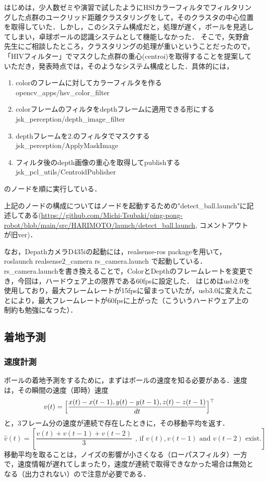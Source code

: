 \documentclass[10pt, oneside, titlepage]{ltjarticle}  %
\begin{document}
はじめは，少人数ゼミや演習で試したようにHSIカラーフィルタでフィルタリングした点群のユークリッド距離クラスタリングをして，そのクラスタの中心位置を取得していた\cite{detect2}．しかし，このシステム構成だと，処理が遅く，ボールを見逃してしまい，卓球ボールの認識システムとして機能しなかった．
そこで，矢野倉先生にご相談したところ，クラスタリングの処理が重いということだったので，「HIVフィルター」でマスクした点群の重心(centroi)を取得することを提案していただき\cite{detect1}，発表時点では，そのようなシステム構成とした．具体的には，
\begin{enumerate}
\item colorのフレームに対してカラーフィルタを作る \\
opencv\_apps/hsv\_color\_filter
\item colorフレームのフィルタをdepthフレームに適用できる形にする \\
jsk\_perception/depth\_image\_filter
\item depthフレームを2.のフィルタでマスクする \\
jsk\_perception/ApplyMaskImage
\item フィルタ後のdepth画像の重心を取得してpublishする \\
jsk\_pcl\_utils/CentroidPublisher
\end{enumerate}
のノードを順に実行している．

上記のノードの構成についてはノードを起動するための"detect\_ball.launch"に記述してある(\url{https://github.com/Michi-Tsubaki/ping-pong-robot/blob/main/src/HARIMOTO/launch/detect_ball.launch}, コメントアウトが旧ver)．

なお，DepathカメラD435iの起動には，realsense-ros packageを用いて，roslaunch realsense2\_camera rs\_camera.launch で起動している．rs\_camera.launchを書き換えることで，ColorとDepthのフレームレートを変更でき，今回は，ハードウェア上の限界である60fpsに設定した．\cite{detect3}
はじめはusb2.0を使用しており，最大フレームレートが15fpsに留まっていたが，usb3.0に変えたことにより，最大フレームレートが60fpsに上がった（こういうハードウェア上の制約も勉強になった）．
\subsection{着地予測}
\subsubsection{速度計測}
ボールの着地予測をするために，まずはボールの速度を知る必要がある．速度は，その瞬間の速度（即時）速度
\[v(t)=\Bigl[\frac{x(t)-x(t-1), y(t)-y(t-1), z(t)-z(t-1)}{dt}\Bigl]^\top\]
と，3フレーム分の速度が連続で存在したときに，その移動平均を返す．
\[\hat{v}(t)=[\frac{v(t)+v(t-1)+v(t-2)}{3}~~\mbox{, if } v(t) , v(t-1) \mbox{ and } v(t-2) \mbox{ exist.}]\]
移動平均を取ることは，ノイズの影響が小さくなる（ローパスフィルタ）一方で，速度情報が遅れてしまったり，速度が連続で取得できなかった場合は無効となる（出力されない）ので注意が必要である．
\end{document}
